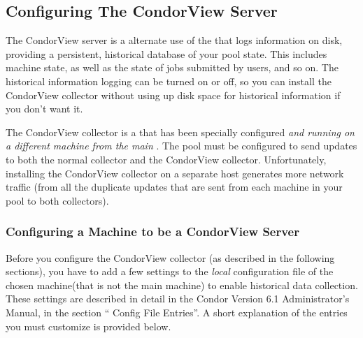 \subsection{\label{sec:Contrib-CondorView-Install}
Configuring The CondorView Server}

The CondorView server is a alternate use of the
that logs information on disk, providing a 
persistent, historical database of your pool state.
This includes machine state, as well as the state of jobs submitted by
users, and so on.
The historical information logging can be turned on or off, so you can
install the CondorView collector without using up disk space for
historical information if you don't want it.

The CondorView collector is a  that has been specially 
configured \emph{and running on a different machine from the main
}. The pool must be configured to send updates to both
the normal collector and the CondorView collector.
Unfortunately, installing the CondorView collector on a separate host
generates more network traffic (from all the duplicate updates that
are sent from each machine in your pool to both collectors).

\subsubsection{\label{sec:CondorView-Server-Setup}
Configuring a Machine to be a CondorView Server} 

Before you configure the CondorView collector (as described in the
following sections), you have to add a few settings to the \emph{local}
configuration file of the chosen machine(that is not the main 
 machine) to enable historical data collection.
These settings are described in detail in the Condor Version 6.1
Administrator's Manual, in the section `` Config File
Entries''.
A short explanation of the entries you must customize is
provided below. 

